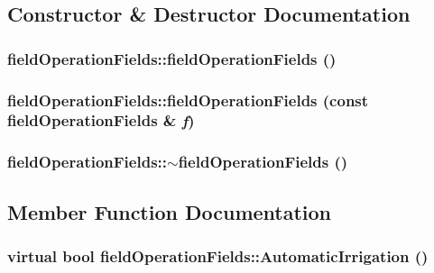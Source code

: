 \subsection{Constructor \& Destructor Documentation}
\hypertarget{classfield_operation_fields_aad9cd8f2eed136e9c879015c9448ea7c}{
\subsubsection[{fieldOperationFields}]{\setlength{\rightskip}{0pt plus 5cm}fieldOperationFields::fieldOperationFields ()}}
\label{classfield_operation_fields_aad9cd8f2eed136e9c879015c9448ea7c}
\hypertarget{classfield_operation_fields_a0d657942c622b9cf5557d65323749d19}{
\subsubsection[{fieldOperationFields}]{\setlength{\rightskip}{0pt plus 5cm}fieldOperationFields::fieldOperationFields (const {\bf fieldOperationFields} \& {\em f})}}
\label{classfield_operation_fields_a0d657942c622b9cf5557d65323749d19}
\hypertarget{classfield_operation_fields_ad37661d4c850cbebe5361edac85ff361}{
\subsubsection[{$\sim$fieldOperationFields}]{\setlength{\rightskip}{0pt plus 5cm}fieldOperationFields::$\sim$fieldOperationFields ()}}
\label{classfield_operation_fields_ad37661d4c850cbebe5361edac85ff361}


\subsection{Member Function Documentation}
\hypertarget{classfield_operation_fields_a46acdf3a83fd93634ecc8f97d44a2f81}{
\subsubsection[{AutomaticIrrigation}]{\setlength{\rightskip}{0pt plus 5cm}virtual bool fieldOperationFields::AutomaticIrrigation ()}}
\label{classfield_operation_fields_a46acdf3a83fd93634ecc8f97d44a2f81}


